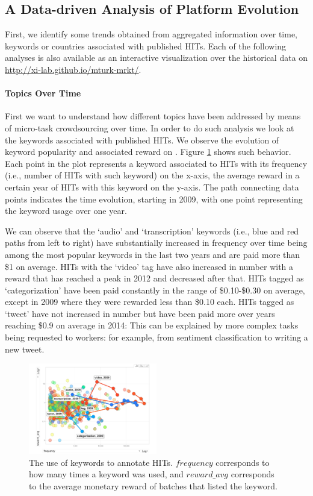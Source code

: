 \subsection{A Data-driven Analysis of Platform Evolution}
First, we identify some trends obtained from aggregated information over time, keywords or countries associated with published HITs.  Each of the following analyses is also available as an interactive visualization over the historical data on \url{http://xi-lab.github.io/mturk-mrkt/}.
\paragraph{Topics  Over Time}
First we want to understand how different topics have been addressed by means of micro-task crowdsourcing over time.
In order to do such analysis we look at the keywords associated with published HITs. We observe the evolution of keyword popularity and associated reward on \amt{}. 
Figure \ref{fig:tagEvolution} shows such behavior. Each point in the plot represents a keyword associated to HITs with its frequency (i.e., number of HITs with such keyword) on the x-axis, the average reward in a certain year of HITs with this keyword on the y-axis. The path connecting data points indicates the time evolution, starting in 2009, with one point representing the keyword usage over one year.

We can observe that the `audio' and `transcription' keywords (i.e., blue and red paths from left to right) have substantially increased in frequency over time being among the most popular keywords in the last two years and are paid more than \$1 on average.
HITs with the `video' tag have also increased in number with a reward that has reached a peak in 2012 and decreased after that.
HITs tagged as `categorization' have been paid constantly in the range of \$0.10-\$0.30 on average, except in 2009 where they were rewarded less than \$0.10 each.
HITs tagged as `tweet' have not increased in number but have been paid more over years reaching \$0.9 on average in 2014: This can be explained by more complex tasks being requested to workers: for example, from sentiment classification to writing a new tweet.

\begin{figure}[tb]
	\centering
		\includegraphics[width=0.5\textwidth]{figures/tagEvolution}
	\caption{The use of keywords to annotate HITs. $frequency$ corresponds to how many times a keyword was used, and $reward\_avg$ corresponds to the average monetary reward of batches that listed the keyword.}
	\label{fig:tagEvolution}
\end{figure}

